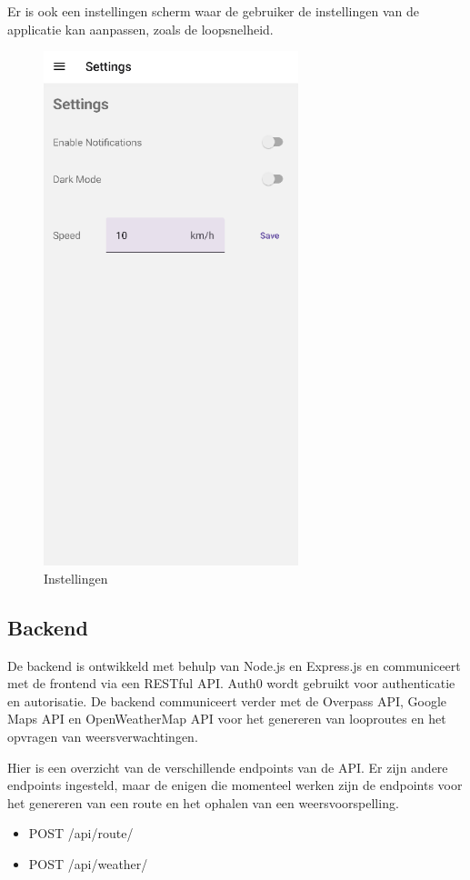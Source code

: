     Er is ook een instellingen scherm waar de gebruiker de instellingen van de applicatie kan aanpassen, zoals de loopsnelheid.

    \begin{figure}[H]
        \includegraphics[width=20em]{./graphics/settings.png}
        \centering
        \caption{Instellingen}
        \label{fig:settings}
    \end{figure}


    \subsection{Backend}
    
    De backend is ontwikkeld met behulp van Node.js en Express.js en communiceert met de frontend via een RESTful API. 
    Auth0 wordt gebruikt voor authenticatie en autorisatie.
    De backend communiceert verder met de Overpass API, Google Maps API en OpenWeatherMap API voor het genereren van looproutes en het opvragen van weersverwachtingen.

    \vspace{1cm}

    
    Hier is een overzicht van de verschillende endpoints van de API. Er zijn andere endpoints ingesteld, maar de enigen die momenteel werken zijn de endpoints voor het genereren van een route en het ophalen van een weersvoorspelling.
    \begin{itemize}
        \item POST /api/route/
        \item POST /api/weather/
    \end{itemize}
  
